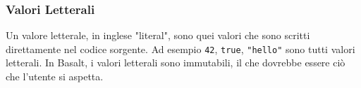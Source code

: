 \subsubsection{Valori Letterali}
Un valore letterale, in inglese "literal", sono quei valori che sono scritti direttamente nel codice sorgente. Ad
esempio \texttt{42}, \texttt{true}, \texttt{"hello"} sono tutti valori letterali. In Basalt, i valori letterali sono
immutabili, il che dovrebbe essere ciò che l'utente si aspetta.